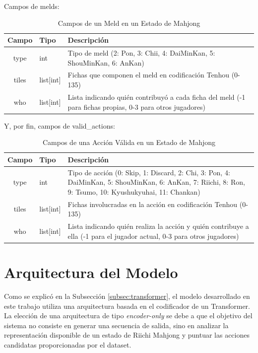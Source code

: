 Campos de melds:

\begin{table}[H]
  \centering
  \caption{Campos de un Meld en un Estado de Mahjong}
  \label{tab:meld_fields}
  \begin{tabular}{@{}clp{8cm}@{}}
    \toprule
    \textbf{Campo} & \textbf{Tipo} & \textbf{Descripción} \\
    \midrule
    type & int & Tipo de meld (2: Pon, 3: Chii, 4: DaiMinKan, 5: ShouMinKan, 6: AnKan) \\
    tiles & list[int] & Fichas que componen el meld en codificación Tenhou (0-135) \\
    who & list[int] & Lista indicando quién contribuyó a cada ficha del meld (-1 para fichas propias, 0-3 para otros jugadores) \\
    \bottomrule
  \end{tabular}
\end{table}

Y, por fin, campos de valid\_actions:

\begin{table}[H]
  \centering
  \caption{Campos de una Acción Válida en un Estado de Mahjong}
  \label{tab:valid_action_fields}
  \begin{tabular}{@{}clp{8cm}@{}}
    \toprule
    \textbf{Campo} & \textbf{Tipo} & \textbf{Descripción} \\
    \midrule
    type & int & Tipo de acción (0: Skip, 1: Discard, 2: Chi, 3: Pon, 4: DaiMinKan, 5: ShouMinKan, 6: AnKan, 7: Riichi, 8: Ron, 9: Tsumo, 10: Kyushukyuhai, 11: Chankan) \\
    tiles & list[int] & Fichas involucradas en la acción en codificación Tenhou (0-135) \\
    who & list[int] & Lista indicando quién realiza la acción y quién contribuye a ella (-1 para el jugador actual, 0-3 para otros jugadores) \\
    \bottomrule
  \end{tabular}
\end{table}


\section{Arquitectura del Modelo}
\label{sec:model-architecture}

Como se explicó en la Subsección \ref{subsec:transformer}, el modelo desarrollado en este trabajo utiliza una arquitectura basada en el codificador de un Transformer. La elección de una arquitectura de tipo \textit{encoder-only} se debe a que el objetivo del sistema no consiste en generar una secuencia de salida, sino en analizar la representación disponible de un estado de Riichi Mahjong y puntuar las acciones candidatas proporcionadas por el dataset.

